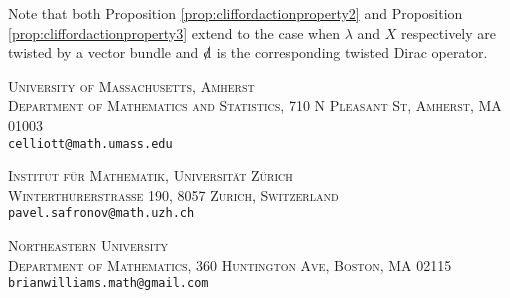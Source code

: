 \documentclass[10pt, oneside]{article}
\begin{document}
Note that both Proposition \ref{prop:cliffordactionproperty2} and Proposition \ref{prop:cliffordactionproperty3} extend to the case when $\lambda$ and $X$ respectively are twisted by a vector bundle and $\sd{\d}$ is the corresponding twisted Dirac operator.

\pagestyle{bib}
\printbibliography

\textsc{University of Massachusetts, Amherst}\\
\textsc{Department of Mathematics and Statistics, 710 N Pleasant St, Amherst, MA 01003}\\
\texttt{celliott@math.umass.edu}\\
\vspace{-5pt}

\textsc{Institut f\"ur Mathematik, Universit\"at Z\"urich}\\
\textsc{Winterthurerstrasse 190, 8057 Zurich, Switzerland}\\
\texttt{pavel.safronov@math.uzh.ch}\\
\vspace{-5pt}

\textsc{Northeastern University}\\
\textsc{Department of Mathematics, 360 Huntington Ave, Boston, MA 02115}\\
\texttt{brianwilliams.math@gmail.com}\\
\end{document}
